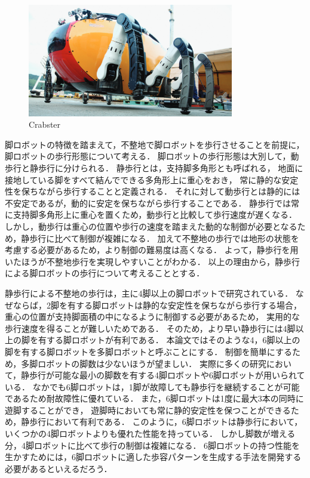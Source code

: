 \begin{figure}[t]
  \begin{center}
    \includegraphics[width=90mm, clip]{figure/chapter1/crabster.png}
    \caption{Crabster}
    \label{fig:crabster} %
  \end{center}
\end{figure}

脚ロボットの特徴を踏まえて，不整地で脚ロボットを歩行させることを前提に，脚ロボットの歩行形態について考える．
脚ロボットの歩行形態は大別して，動歩行と静歩行に分けられる．
静歩行とは，支持脚多角形とも呼ばれる，
地面に接地している脚をすべて結んでできる多角形上に重心をおき，
常に静的な安定性を保ちながら歩行することと定義される\cite{Hirose_Static_stability_criterion}．
それに対して動歩行とは静的には不安定であるが，動的に安定を保ちながら歩行することである．
静歩行では常に支持脚多角形上に重心を置くため，動歩行と比較して歩行速度が遅くなる．
しかし，動歩行は重心の位置や歩行の速度を踏まえた動的な制御が必要となるため，静歩行に比べて制御が複雑になる．
加えて不整地の歩行では地形の状態を考慮する必要があるため，より制御の難易度は高くなる．
よって，静歩行を用いたほうが不整地歩行を実現しやすいことがわかる．
以上の理由から，静歩行による脚ロボットの歩行について考えることとする．

静歩行による不整地の歩行は，主に4脚以上の脚ロボットで研究されている．
なぜならば，2脚を有する脚ロボットは静的な安定性を保ちながら歩行する場合，
重心の位置が支持脚面積の中になるように制御する必要があるため，
実用的な歩行速度を得ることが難しいためである．
そのため，より早い静歩行には4脚以上の脚を有する脚ロボットが有利である．
本論文ではそのような4，6脚以上の脚を有する脚ロボットを多脚ロボットと呼ぶことにする．
制御を簡単にするため，多脚ロボットの脚数は少ないほうが望ましい．
実際に多くの研究において，静歩行が可能な最小の脚数を有する4脚ロボットや6脚ロボットが用いられている．
なかでも6脚ロボットは，1脚が故障しても静歩行を継続することが可能であるため耐故障性に優れている．
また，6脚ロボットは1度に最大3本の同時に遊脚することができ，
遊脚時においても常に静的安定性を保つことができるため，静歩行において有利である．
このように，6脚ロボットは静歩行において，いくつかの4脚ロボットよりも優れた性能を持っている．
しかし脚数が増える分，4脚ロボットに比べて歩行の制御は複雑になる．
6脚ロボットの持つ性能を生かすためには，6脚ロボットに適した歩容パターンを生成する手法を開発する必要があるといえるだろう．

